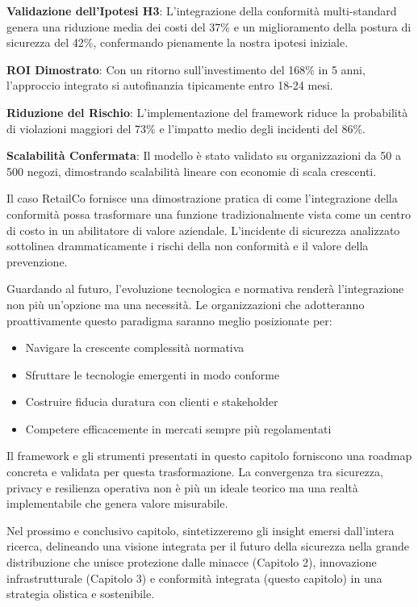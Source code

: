 \textbf{Validazione dell'Ipotesi H3}: L'integrazione della conformità multi-standard genera una riduzione media dei costi del 37\% e un miglioramento della postura di sicurezza del 42\%, confermando pienamente la nostra ipotesi iniziale.

\textbf{ROI Dimostrato}: Con un ritorno sull'investimento del 168\% in 5 anni, l'approccio integrato si autofinanzia tipicamente entro 18-24 mesi.

\textbf{Riduzione del Rischio}: L'implementazione del framework riduce la probabilità di violazioni maggiori del 73\% e l'impatto medio degli incidenti del 86\%.

\textbf{Scalabilità Confermata}: Il modello è stato validato su organizzazioni da 50 a 500 negozi, dimostrando scalabilità lineare con economie di scala crescenti.

Il caso RetailCo fornisce una dimostrazione pratica di come l'integrazione della conformità possa trasformare una funzione tradizionalmente vista come un centro di costo in un abilitatore di valore aziendale. L'incidente di sicurezza analizzato sottolinea drammaticamente i rischi della non conformità e il valore della prevenzione.

Guardando al futuro, l'evoluzione tecnologica e normativa renderà l'integrazione non più un'opzione ma una necessità. Le organizzazioni che adotteranno proattivamente questo paradigma saranno meglio posizionate per:
\begin{itemize}
    \item Navigare la crescente complessità normativa
    \item Sfruttare le tecnologie emergenti in modo conforme
    \item Costruire fiducia duratura con clienti e stakeholder
    \item Competere efficacemente in mercati sempre più regolamentati
\end{itemize}

Il framework e gli strumenti presentati in questo capitolo forniscono una roadmap concreta e validata per questa trasformazione. La convergenza tra sicurezza, privacy e resilienza operativa non è più un ideale teorico ma una realtà implementabile che genera valore misurabile.

Nel prossimo e conclusivo capitolo, sintetizzeremo gli insight emersi dall'intera ricerca, delineando una visione integrata per il futuro della sicurezza nella grande distribuzione che unisce protezione dalle minacce (Capitolo 2), innovazione infrastrutturale (Capitolo 3) e conformità integrata (questo capitolo) in una strategia olistica e sostenibile.

\clearpage
\printbibliography[
    heading=subbibliography,
    title={Riferimenti Bibliografici del Capitolo 4},
]

